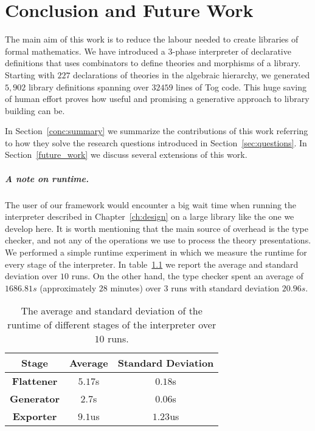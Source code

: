 \chapter{Conclusion and Future Work}
\label{ch:conclusion}

The main aim of this work is to reduce the labour needed to create libraries of formal mathematics. We have introduced a $3$-phase interpreter of declarative definitions that uses combinators to define theories and morphisms of a library. Starting with $227$ declarations of theories in the algebraic hierarchy, we generated $5,902$ library definitions spanning over $32459$ lines of Tog code. 
This huge saving of human effort proves how useful and promising a generative approach to library building can be.  

In Section~\ref{conc:summary} we summarize the contributions of this work referring to how they solve the research questions introduced in Section~\ref{sec:questions}. In Section~\ref{future_work} we discuss several extensions of this work. 

\paragraph{A note on runtime.} The user of our framework would encounter a big wait time when running the interpreter described in Chapter~\ref{ch:design} on a large library like the one we develop here. It is worth mentioning that the main source of overhead is the type checker, and not any of the operations we use to process the theory presentations. We performed a simple runtime experiment in which we measure the runtime for every stage of the interpreter. In table~\ref{table:runtimes} we report the average and standard deviation over $10$ runs. 
On the other hand, the type checker spent an average of $1686.81s$ (approximately $28$ minutes) over $3$ runs with standard deviation $20.96s$.
\begin{table}
\begin{center}
\begin{tabular}{| c | c | c |} \hline 
\textbf{Stage} & \textbf{Average} & \textbf{Standard Deviation} \\ \hline
\textbf{Flattener} & $5.17$s & $0.18$s \\ \hline 
\textbf{Generator} & $2.7$s & $0.06$s \\ \hline 
\textbf{Exporter} & $9.1$us & $1.23$us \\ \hline 
\end{tabular}
\end{center}
\caption{The average and standard deviation of the runtime of different stages of the interpreter over $10$ runs.}
\label{table:runtimes}
\end{table}



